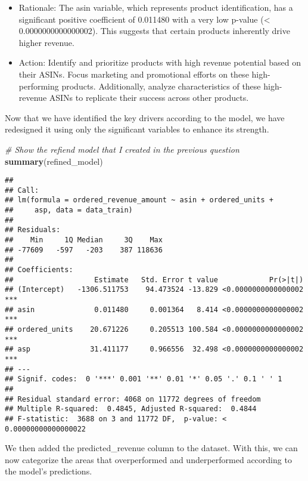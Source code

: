\documentclass[
]{article}
\newenvironment{Shaded}{\begin{snugshade}}{\end{snugshade}}
\newcommand{\CommentTok}[1]{\textcolor[rgb]{0.56,0.35,0.01}{\textit{#1}}}
\newcommand{\FunctionTok}[1]{\textcolor[rgb]{0.13,0.29,0.53}{\textbf{#1}}}
\newcommand{\NormalTok}[1]{#1}
\begin{document}
\begin{itemize}
\item
  Rationale: The asin variable, which represents product identification,
  has a significant positive coefficient of 0.011480 with a very low
  p-value (\textless{} 0.0000000000000002). This suggests that certain
  products inherently drive higher revenue.
\item
  Action: Identify and prioritize products with high revenue potential
  based on their ASINs. Focus marketing and promotional efforts on these
  high-performing products. Additionally, analyze characteristics of
  these high-revenue ASINs to replicate their success across other
  products.
\end{itemize}

Now that we have identified the key drivers according to the model, we
have redesigned it using only the significant variables to enhance its
strength.

\begin{Shaded}
\begin{Highlighting}[]
\CommentTok{\# Show the refiend model that I created in the previous question}
\FunctionTok{summary}\NormalTok{(refined\_model)}
\end{Highlighting}
\end{Shaded}

\begin{verbatim}
## 
## Call:
## lm(formula = ordered_revenue_amount ~ asin + ordered_units + 
##     asp, data = data_train)
## 
## Residuals:
##    Min     1Q Median     3Q    Max 
## -77609   -597   -203    387 118636 
## 
## Coefficients:
##                   Estimate   Std. Error t value            Pr(>|t|)    
## (Intercept)   -1306.511753    94.473524 -13.829 <0.0000000000000002 ***
## asin              0.011480     0.001364   8.414 <0.0000000000000002 ***
## ordered_units    20.671226     0.205513 100.584 <0.0000000000000002 ***
## asp              31.411177     0.966556  32.498 <0.0000000000000002 ***
## ---
## Signif. codes:  0 '***' 0.001 '**' 0.01 '*' 0.05 '.' 0.1 ' ' 1
## 
## Residual standard error: 4068 on 11772 degrees of freedom
## Multiple R-squared:  0.4845, Adjusted R-squared:  0.4844 
## F-statistic:  3688 on 3 and 11772 DF,  p-value: < 0.00000000000000022
\end{verbatim}

We then added the predicted\_revenue column to the dataset. With this,
we can now categorize the areas that overperformed and underperformed
according to the model's predictions.
\end{document}

